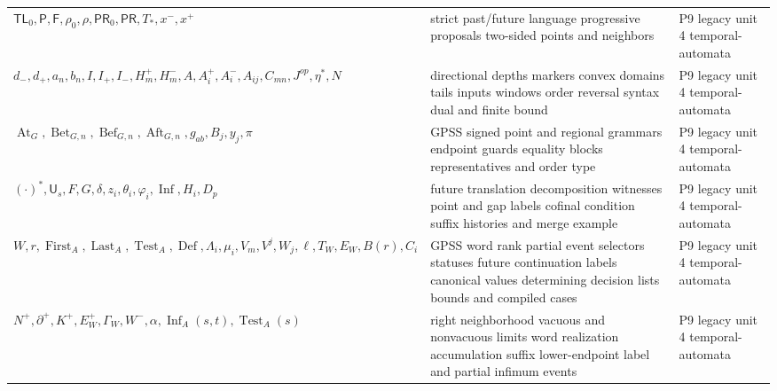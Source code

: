 \begin{longtable}{@{}p{}p{}p{}@{}}
\(\mathsf{TL}_0,\allowbreak \mathsf P,\allowbreak \mathsf F,\allowbreak \rho_0,\allowbreak \rho,\allowbreak \mathsf{PR}_0,\allowbreak \mathsf{PR},\allowbreak T_*,\allowbreak x^-,\allowbreak x^+\) & strict past/future language progressive proposals two-sided points and neighbors & P9 legacy unit 4 temporal-\allowbreak{}automata \\
\(d_-,\allowbreak d_+,\allowbreak a_n,\allowbreak b_n,\allowbreak I,\allowbreak I_+,\allowbreak I_-,\allowbreak H_m^+,\allowbreak H_m^-,\allowbreak A,\allowbreak A_i^+,\allowbreak A_i^-,\allowbreak A_{ij},\allowbreak C_{mn},\allowbreak J^{op},\allowbreak \eta^*,\allowbreak N\) & directional depths markers convex domains tails inputs windows order reversal syntax dual and finite bound & P9 legacy unit 4 temporal-\allowbreak{}automata \\
\(\operatorname{At}_G,\allowbreak \operatorname{Bet}_{G,n},\allowbreak \operatorname{Bef}_{G,n},\allowbreak \operatorname{Aft}_{G,n},\allowbreak g_{ab},\allowbreak B_j,\allowbreak y_j,\allowbreak \pi\) & GPSS signed point and regional grammars endpoint guards equality blocks representatives and order type & P9 legacy unit 4 temporal-\allowbreak{}automata \\
\((\cdot)^*,\allowbreak \mathsf U_s,\allowbreak F,\allowbreak G,\allowbreak \delta,\allowbreak z_i,\allowbreak \theta_i,\allowbreak \varphi_i,\allowbreak \operatorname{Inf},\allowbreak H_i,\allowbreak D_p\) & future translation decomposition witnesses point and gap labels cofinal condition suffix histories and merge example & P9 legacy unit 4 temporal-\allowbreak{}automata \\
\(W,\allowbreak r,\allowbreak \operatorname{First}_A,\allowbreak \operatorname{Last}_A,\allowbreak \operatorname{Test}_A,\allowbreak \operatorname{Def},\allowbreak \Lambda_i,\allowbreak \mu_i,\allowbreak V_m,\allowbreak V^j,\allowbreak W_j,\allowbreak \ell,\allowbreak T_W,\allowbreak E_W,\allowbreak B(r),\allowbreak C_i\) & GPSS word rank partial event selectors statuses future continuation labels canonical values determining decision lists bounds and compiled cases & P9 legacy unit 4 temporal-\allowbreak{}automata \\
\(N^+,\allowbreak \partial^+,\allowbreak K^+,\allowbreak E_W^+,\allowbreak \Gamma_W,\allowbreak W^-,\allowbreak \alpha,\allowbreak \operatorname{Inf}_A(s,\allowbreak t),\allowbreak \operatorname{Test}_A(s)\) & right neighborhood vacuous and nonvacuous limits word realization accumulation suffix lower-endpoint label and partial infimum events & P9 legacy unit 4 temporal-\allowbreak{}automata \\

\end{longtable}
